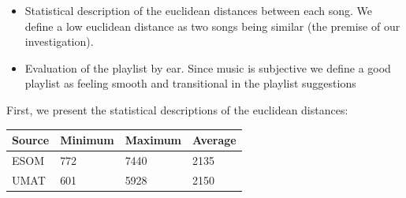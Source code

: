 \begin{itemize}
\item Statistical description of the euclidean distances between each song. We define a low euclidean distance as two songs being similar (the premise of our investigation).\\
\item Evaluation of the playlist by ear. Since music is subjective we define a good playlist as feeling smooth and transitional in the playlist suggestions \\
\end{itemize}

First, we present the statistical descriptions of the euclidean distances: 

\begin{center}
    \begin{tabular}{  l | l | l | p{5cm} }
    Source & Minimum & Maximum & Average  \\ \hline
    ESOM & 772 & 7440 & 2135 \\ 
    UMAT & 601 & 5928 & 2150 \\ 
   
    \end{tabular}
\end{center}






